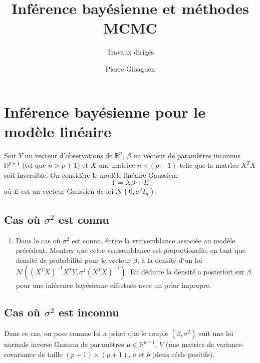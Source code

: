 \documentclass[]{article}
\title{Inférence bayésienne et méthodes MCMC}
\subtitle{Travaux dirigés}
\author{Pierre Gloaguen}
\date{}
\providecommand{\tightlist}{%
  \setlength{\itemsep}{0pt}\setlength{\parskip}{0pt}}
\begin{document}
\maketitle

\hypertarget{infuxe9rence-bayuxe9sienne-pour-le-moduxe8le-linuxe9aire}{%
\section{Inférence bayésienne pour le modèle
linéaire}\label{infuxe9rence-bayuxe9sienne-pour-le-moduxe8le-linuxe9aire}}

Soit \(Y\) un vecteur d'observations de \(\mathbb{R}^n\), \(\beta\) un
vecteur de paramètres inconnus \(\mathbb{R}^{p + 1}\) (tel que
\(n > p + 1\)) et \(X\) une matrice \(n \times (p +1)\) telle que la
matrice \(X^T X\) soit inversible. On considère le modèle linéaire
Gaussien: \[Y = X\beta + E\] où \(E\) est un vecteur Gaussien de loi
\(\mathcal{N}(0, \sigma^2I_n)\).

\hypertarget{cas-ouxf9-sigma2-est-connu}{%
\subsection{\texorpdfstring{Cas où \(\sigma^2\) est
connu}{Cas où \textbackslash{}sigma\^{}2 est connu}}\label{cas-ouxf9-sigma2-est-connu}}

\begin{enumerate}
\def\labelenumi{\arabic{enumi}.}
\tightlist
\item
  Dans le cas où \(\sigma^2\) est connu, écrire la vraisemblance
  associée au modèle précédent. Montrer que cette vraisemblance est
  proportionelle, en tant que densité de probabilité pour le vecteur
  \(\beta\), à la densité d'un loi
  \(\mathcal{N}((X^TX)^{-1}X^TY, \sigma^2 (X^TX)^{-1})\). En déduire la
  densité a posteriori sur \(\beta\) pour une inférence bayésienne
  effectuée avec un prior impropre.
\end{enumerate}

\hypertarget{cas-ouxf9-sigma2-est-inconnu}{%
\subsection{\texorpdfstring{Cas où \(\sigma^2\) est
inconnu}{Cas où \textbackslash{}sigma\^{}2 est inconnu}}\label{cas-ouxf9-sigma2-est-inconnu}}

Dans ce cas, on pose comme loi a priori que le couple
\((\beta, \sigma^2)\) suit une loi normale inverse Gamma de paramètres
\(\mu \in \mathbb{R}^{p +1}\), \(V\) (une matrice de variance-covariance
de taille \((p+1) \times (p+1)\), \(a\) et \(b\) (deux réels positifs).
\end{document}
